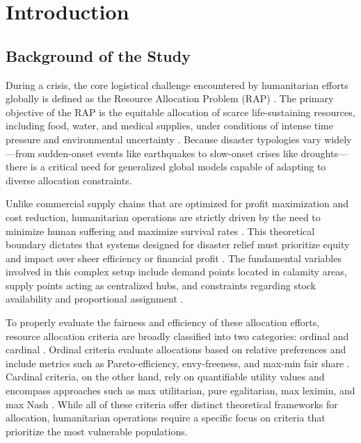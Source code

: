 \chapter{Introduction}

\section{Background of the Study}
During a crisis, the core logistical challenge encountered by humanitarian efforts globally is defined as the Resource Allocation Problem (RAP) \cite{starr2014, knott1987}. The primary objective of the RAP is the equitable allocation of scarce life-sustaining resources, including food, water, and medical supplies, under conditions of intense time pressure and environmental uncertainty \cite{noyan2018}. Because disaster typologies vary widely—from sudden-onset events like earthquakes to slow-onset crises like droughts—there is a critical need for generalized global models capable of adapting to diverse allocation constraints.

Unlike commercial supply chains that are optimized for profit maximization and cost reduction, humanitarian operations are strictly driven by the need to minimize human suffering and maximize survival rates \cite{gutjahr2018}. This theoretical boundary dictates that systems designed for disaster relief must prioritize equity and impact over sheer efficiency or financial profit \cite{huang2012}. The fundamental variables involved in this complex setup include demand points located in calamity areas, supply points acting as centralized hubs, and constraints regarding stock availability and proportional assignment \cite{lin2011, cui2010}.

To properly evaluate the fairness and efficiency of these allocation efforts, resource allocation criteria are broadly classified into two categories: ordinal and cardinal \cite{vitoriano2011, ferrer2018}. Ordinal criteria evaluate allocations based on relative preferences and include metrics such as Pareto-efficiency, envy-freeness, and max-min fair share \cite{gutjahr2018, huang2012}. Cardinal criteria, on the other hand, rely on quantifiable utility values and encompass approaches such as max utilitarian, pure egalitarian, max leximin, and max Nash \cite{vitoriano2011}. While all of these criteria offer distinct theoretical frameworks for allocation, humanitarian operations require a specific focus on criteria that prioritize the most vulnerable populations. 

